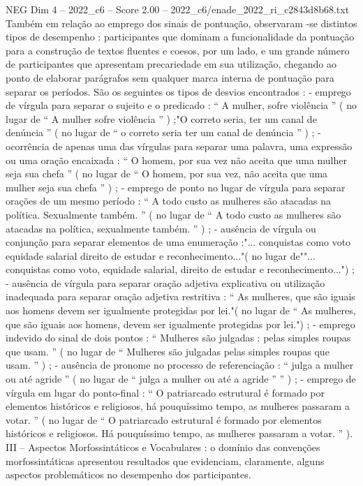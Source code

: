\begin{textsample}{NEG Dim 4 – 2022\_c6 – Score 2.00 – 2022\_c6/enade\_2022\_ri\_c2843d8b68.txt}
Também em relação ao emprego dos sinais de pontuação, observaram -se distintos tipos de desempenho : participantes que dominam a funcionalidade da pontuação para a construção de textos fluentes e coesos, por um lado, e um grande número de participantes que apresentam precariedade em sua utilização, chegando ao ponto de elaborar parágrafos sem qualquer marca interna de pontuação para separar os períodos.
São os seguintes os tipos de desvios encontrados : - emprego de vírgula para separar o sujeito e o predicado : “ A mulher, sofre violência ” ( no lugar de “ A mulher sofre violência ” ) ;"O correto seria, ter um canal de denúncia ” ( no lugar de “ o correto seria ter um canal de denúncia ” ) ; - ocorrência de apenas uma das vírgulas para separar uma palavra, uma expressão ou uma oração encaixada : “ O homem, por sua vez não aceita que uma mulher seja sua chefa ” ( no lugar de “ O homem, por sua vez, não aceita que uma mulher seja sua chefa ” ) ; - emprego de ponto no lugar de vírgula para separar orações de um mesmo período : “ A todo custo as mulheres são atacadas na política.
Sexualmente também. ” ( no lugar de “ A todo custo as mulheres são atacadas na política, sexualmente também. ” ) ; - ausência de vírgula ou conjunção para separar elementos de uma enumeração :"... conquistas como voto equidade salarial direito de estudar e reconhecimento..."( no lugar de""... conquistas como voto, equidade salarial, direito de estudar e reconhecimento...") ; - ausência de vírgula para separar oração adjetiva explicativa ou utilização inadequada para separar oração adjetiva restritiva : “ As mulheres, que são iguais aos homens devem ser igualmente protegidas por lei."( no lugar de “ As mulheres, que são iguais aos homens, devem ser igualmente protegidas por lei.") ; - emprego indevido do sinal de dois pontos : “ Mulheres são julgadas : pelas simples roupas que usam. ” ( no lugar de “ Mulheres são julgadas pelas simples roupas que usam. ” ) ; - ausência de pronome no processo de referenciação : “ julga a mulher ou até agride ” ( no lugar de “ julga a mulher ou até a agride ” ” ) ; - emprego de vírgula em lugar do ponto-final : “ O patriarcado estrutural é formado por elementos históricos e religiosos, há pouquíssimo tempo, as mulheres passaram a votar. ” ( no lugar de “ O patriarcado estrutural é formado por elementos históricos e religiosos.
Há pouquíssimo tempo, as mulheres passaram a votar. ” ).
III – Aspectos Morfossintáticos e Vocabulares : o domínio das convenções morfossintáticas apresentou resultados que evidenciam, claramente, alguns aspectos problemáticos no desempenho dos participantes.

\end{textsample}
